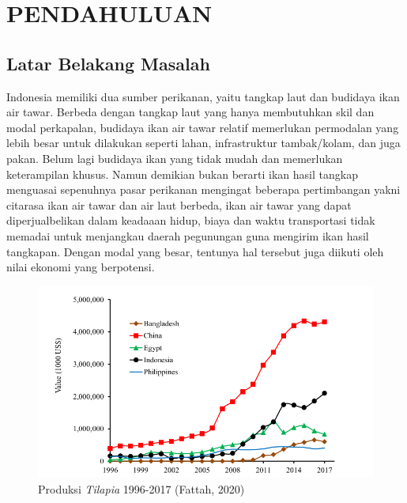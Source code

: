 
\chapter{PENDAHULUAN}

\section{Latar Belakang Masalah}

Indonesia memiliki dua sumber perikanan, yaitu tangkap laut dan budidaya ikan air tawar. Berbeda dengan tangkap laut yang hanya membutuhkan skil dan modal perkapalan, budidaya ikan air tawar relatif memerlukan permodalan yang lebih besar untuk dilakukan seperti  lahan,  infrastruktur tambak/kolam, dan juga pakan. Belum lagi budidaya ikan yang tidak mudah dan memerlukan keterampilan khusus. Namun demikian bukan berarti ikan hasil tangkap menguasai sepenuhnya pasar perikanan mengingat beberapa pertimbangan yakni citarasa ikan air tawar dan air laut berbeda, ikan air tawar yang dapat diperjualbelikan dalam keadaaan hidup, biaya dan waktu transportasi tidak memadai untuk menjangkau daerah pegunungan guna mengirim ikan hasil tangkapan. Dengan modal yang besar, tentunya hal tersebut juga diikuti oleh nilai ekonomi yang berpotensi.

\begin{figure}[H]
	\centering
	\includegraphics[keepaspectratio, width=12cm]{gambar/produksi_nila}
	\caption{Produksi \emph{Tilapia} 1996-2017 (Fattah, 2020)}
	\label{gambar:produksi_nila}
\end{figure}

